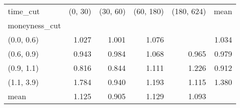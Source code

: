 \begin{tabular}{lrrrrr}
\toprule
time\_cut &  (0, 30) &  (30, 60) &  (60, 180) &  (180, 624) &  mean \\
moneyness\_cut &          &           &            &             &       \\
\midrule
(0.0, 0.6)    &    1.027 &     1.001 &      1.076 &             & 1.034 \\
(0.6, 0.9)    &    0.943 &     0.984 &      1.068 &       0.965 & 0.979 \\
(0.9, 1.1)    &    0.816 &     0.844 &      1.111 &       1.226 & 0.912 \\
(1.1, 3.9)    &    1.784 &     0.940 &      1.193 &       1.115 & 1.380 \\
mean          &    1.125 &     0.905 &      1.129 &       1.093 &       \\
\bottomrule
\end{tabular}
